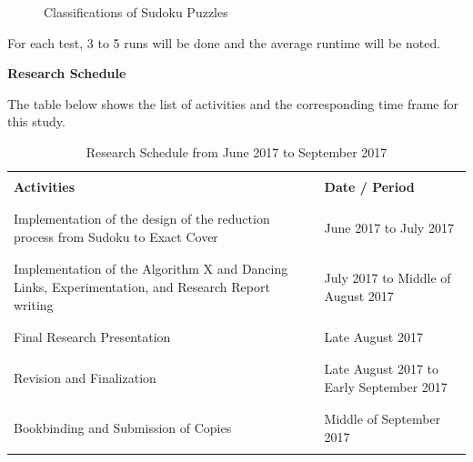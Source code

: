\documentclass[a4paper,oneside,11pt]{report}
\begin{document}
\begin{figure}[h]
  \hspace{2cm}
  \caption{Classifications of Sudoku Puzzles}
\end{figure}
\noindent For each test, 3 to 5 runs will be done and the average runtime will be noted.

\newpage
\begin{center}
\LARGE \hspace{2.5cm} \textbf{Research Schedule}
\newline
\end{center}

The table below shows the list of activities and the corresponding time frame for this study.
\begin{table}[!ht]
\begin{center}
\begin{tabular}{p{3.75in} | p{2in}}
\hline
&\\
\textbf{Activities} & \textbf{Date / Period}\\
&\\
\hline
\hline
&\\
Implementation of the design of the reduction process from Sudoku to Exact Cover & June 2017 to July 2017\\
&\\
\hline
&\\
Implementation of the Algorithm X and Dancing Links, Experimentation, and Research Report writing & July 2017 to Middle of August 2017\\
&\\
\hline
&\\
Final Research Presentation & Late August 2017\\
&\\
\hline
&\\
Revision and Finalization & Late August 2017 to Early September 2017\\
&\\
\hline
&\\
Bookbinding and Submission of Copies & Middle of September 2017\\
&\\
\hline
\end{tabular}
\end{center}
\caption{Research Schedule from June 2017 to September 2017}
\end{table}

\nocite{*}

\end{document}
